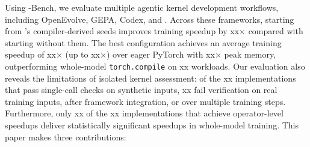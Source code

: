Using \method-Bench, we evaluate multiple agentic kernel development workflows, including OpenEvolve, GEPA, Codex, and \method. Across these frameworks, starting from \name's compiler-derived seeds improves training speedup by xx$\times$ compared with starting without them. The best configuration achieves an average training speedup of xx$\times$ (up to xx$\times$) over eager PyTorch with xx$\times$ peak memory, outperforming whole-model \texttt{torch.compile} on xx workloads. Our evaluation also reveals the limitations of isolated kernel assessment: of the xx implementations that pass single-call checks on synthetic inputs, xx fail verification on real training inputs, after framework integration, or over multiple training steps. Furthermore, only xx of the xx implementations that achieve operator-level speedups deliver statistically significant speedups in whole-model training.
This paper makes three contributions:


